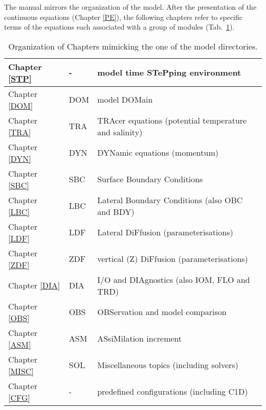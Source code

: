 \documentclass[NEMO_book]{subfiles}
\begin{document}
The manual mirrors the organization of the model. 
After the presentation of the continuous equations (Chapter \ref{PE}), the following chapters 
refer to specific terms of the equations each associated with a group of modules (Tab.~\ref{Tab_chap}).


\begin{table}[!t]	
\caption{ \label{Tab_chap}   Organization of Chapters mimicking the one of the model directories. }
\begin{center} 	\begin{tabular}{|l|l|l|}	\hline
Chapter \ref{STP}	& -   		        & model time STePping environment \\		\hline
Chapter \ref{DOM}	& DOM		& model DOMain \\		\hline
Chapter \ref{TRA}	& TRA		& TRAcer equations (potential temperature and salinity) \\   \hline
Chapter \ref{DYN}	& DYN		& DYNamic equations (momentum) \\		\hline
Chapter \ref{SBC} 	& SBC		& Surface Boundary Conditions \\			\hline
Chapter \ref{LBC}	& LBC		& Lateral Boundary Conditions (also OBC and BDY)  \\ 		\hline
Chapter \ref{LDF}	& LDF		& Lateral DiFfusion (parameterisations) \\	\hline
Chapter \ref{ZDF}	& ZDF		& vertical (Z) DiFfusion (parameterisations)  \\		\hline
Chapter \ref{DIA}	& DIA		& I/O and DIAgnostics (also IOM, FLO and TRD) \\		\hline
Chapter \ref{OBS}	& OBS		& OBServation and model comparison  \\		\hline
Chapter \ref{ASM}	& ASM		& ASsiMilation increment  \\		\hline
Chapter \ref{MISC}	& SOL		& Miscellaneous  topics (including solvers)  \\       \hline
Chapter \ref{CFG}	&  - 			& predefined configurations (including C1D) \\		\hline
\end{tabular} 	
\end{center}	\end{table}
\end{document}
